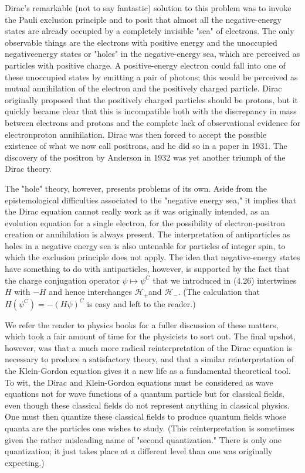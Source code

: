 \documentclass[10pt, letterpaper]{article}
\begin{document}
Dirac's remarkable (not to say fantastic) solution to this problem was to invoke the Pauli exclusion principle and to posit that almost all the negative-energy states are already occupied by a completely invisible "sea" of electrons. The only observable things are the electrons with positive energy and the unoccupied negativeenergy states or "holes" in the negative-energy sea, which are perceived as particles with positive charge. A positive-energy electron could fall into one of these unoccupied states by emitting a pair of photons; this would be perceived as mutual annihilation of the electron and the positively charged particle. Dirac originally proposed that the positively charged particles should be protons, but it quickly became clear that this is incompatible both with the discrepancy in mass between electrons and protons and the complete lack of observational evidence for electronproton annihilation. Dirac was then forced to accept the possible existence of what we now call positrons, and he did so in a paper in 1931. The discovery of the positron by Anderson in 1932 was yet another triumph of the Dirac theory.

The "hole" theory, however, presents problems of its own. Aside from the epistemological difficulties associated to the "negative energy sea," it implies that the Dirac equation cannot really work as it was originally intended, as an evolution equation for a single electron, for the possibility of electron-positron creation or annihilation is always present. The interpretation of antiparticles as holes in a negative energy sea is also untenable for particles of integer spin, to which the exclusion principle does not apply. The idea that negative-energy states have something to do with antiparticles, however, is supported by the fact that the charge conjugation operator $\psi \mapsto \psi^{C}$ that we introduced in (4.26) intertwines $H$ with $-H$ and hence interchanges $\mathcal{H}_{+}$and $\mathcal{H}_{-}$. (The calculation that $H\left(\psi^{C}\right)=-(H \psi)^{C}$ is easy and left to the reader.)

We refer the reader to physics books for a fuller discussion of these matters, which took a fair amount of time for the physicists to sort out. The final upshot, however, was that a much more radical reinterpretation of the Dirac equation is necessary to produce a satisfactory theory, and that a similar reinterpretation of the Klein-Gordon equation gives it a new life as a fundamental theoretical tool. To wit, the Dirac and Klein-Gordon equations must be considered as wave equations not for wave functions of a quantum particle but for classical fields, even though these classical fields do not represent anything in classical physics. One must then quantize these classical fields to produce quantum fields whose quanta are the particles one wishes to study. (This reinterpretation is sometimes given the rather misleading name of "second quantization." There is only one quantization; it just takes place at a different level than one was originally expecting.)
\end{document}
